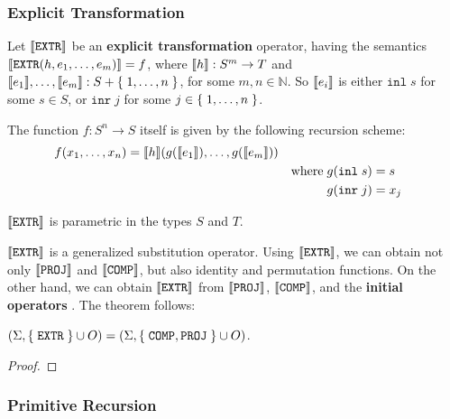 \subsubsection{Explicit Transformation}

\begin{definition} \cite[p. 21]{smullyan-1961} Let $\sem{\mathtt{EXTR}}$ be an
\textbf{explicit transformation} operator, having the semantics
$\sem{\mathtt{EXTR}\p{h,e_1,\ldots,e_m}} = f$, where $\sem{h} : S^m \rightarrow
T$ and $\sem{e_1}, \ldots, \sem{e_m} : S + \set{1,\ldots,n}$, for some $m,n \in
\mathbb{N}$. So $\sem{e_i}$ is either $\mathtt{inl} \; s$ for some $s \in S$,
or $\mathtt{inr} \; j$ for some $j \in \set{1,\ldots, n}$.

The function $f : S^n \rightarrow S$ itself is given by the following recursion
scheme:\begin{alignat*}{3}
%
f\p{x_1,\ldots,x_n} &= \sem{h}\p{g\p{\sem{e_1}},\ldots,g\p{\sem{e_m}}} \\
%
& & \text{where} \; g\p{\mathtt{inl} \; s} &= s \\
%
& & g\p{\mathtt{inr} \; j} &= x_j
%
\end{alignat*}

\end{definition}

\begin{remark} $\sem{\mathtt{EXTR}}$ is parametric in the types $S$ and $T$.
\end{remark}

$\sem{\mathtt{EXTR}}$ is a generalized substitution operator. Using
$\sem{\mathtt{EXTR}}$, we can obtain not only $\sem{\mathtt{PROJ}}$ and
$\sem{\mathtt{COMP}}$, but also identity and permutation functions.  On the
other hand, we can obtain $\sem{\mathtt{EXTR}}$ from $\sem{\mathtt{PROJ}}$,
$\sem{\mathtt{COMP}}$, and the {\bfseries \color{red} initial operators}
\cite{rose-1984}. The theorem follows:

\begin{theorem}\label{thm:extr-comp-proj} $\p{\Sigma,\set{\mathtt{EXTR}} \cup
O} = \p{\Sigma,\set{\mathtt{COMP}, \mathtt{PROJ}} \cup O}$. \end{theorem}

\begin{proof}  \end{proof}

\subsubsection{Primitive Recursion}

